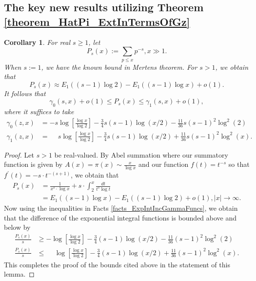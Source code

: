 \documentclass[11pt,reqno,a4letter]{article}
\numberwithin{figure}{section}
\numberwithin{table}{section}
\theoremstyle{plain}
\newtheorem{cor}[theorem]{Corollary}
\numberwithin{theorem}{section}
\theoremstyle{definition}
\begin{document}
\subsection{The key new results utilizing Theorem \ref{theorem_HatPi_ExtInTermsOfGz}} 

\begin{cor} 
\label{cor_PartialSumsOfReciprocalsOfPrimePowers} 
For real $s \geq 1$, let 
\[
P_s(x) := \sum_{p \leq x} p^{-s}, x \gg 1. 
\]
When $s := 1$, we have the known bound in Mertens theorem. For $s > 1$, we obtain that 
\[
P_s(x) \approx E_1((s-1) \log 2) - E_1((s-1) \log x) + o(1). 
\]
It follows that 
\[
\gamma_0(s, x) + o(1) \leq P_s(x) \leq \gamma_1(s, x) + o(1), 
\]
where it suffices to take 
\begin{align*}
\gamma_0(z, x) & = -s\log\left[\frac{\log x}{\log 2}\right] - \frac{3}{4}s(s-1) \log(x/2) - 
     \frac{11}{36} s(s-1)^2 \log^2(2) \\ 
\gamma_1(z, x) & = \phantom{-} s\log\left[\frac{\log x}{\log 2}\right] - \frac{3}{4}s(s-1) \log(x/2) + 
     \frac{11}{36} s(s-1)^2 \log^2(x). 
\end{align*}
\end{cor} 
\begin{proof} 
Let $s > 1$ be real-valued. 
By Abel summation where our summatory function is given by $A(x) = \pi(x) \sim \frac{x}{\log x}$ and 
our function $f(t) = t^{-s}$ so that $f^{\prime}(t) = -s \cdot t^{-(s+1)}$, we obtain that 
\begin{align*} 
P_s(x) & = \frac{1}{x^s \cdot \log x} + s \cdot \int_2^{x} \frac{dt}{t^s \log t} \\ 
     & = E_1((s-1) \log x) - E_1((s-1) \log 2) + o(1), |x| \rightarrow \infty. 
\end{align*} 
Now using the inequalities in Facts \ref{facts_ExpIntIncGammaFuncs}, we obtain that the 
difference of the exponential integral functions is bounded above and below by 
\begin{align*} 
\frac{P_s(x)}{s} & \geq -\log\left[\frac{\log x}{\log 2}\right] - \frac{3}{4}(s-1) \log(x/2) - 
     \frac{11}{36} (s-1)^2 \log^2(2) \\ 
\frac{P_s(x)}{s} & \leq \phantom{-} \log\left[\frac{\log x}{\log 2}\right] - \frac{3}{4}(s-1) \log(x/2) + 
     \frac{11}{36} (s-1)^2 \log^2(x). 
\end{align*} 
This completes the proof of the bounds cited above in the statement of this lemma. 
\end{proof} 
\end{document}
